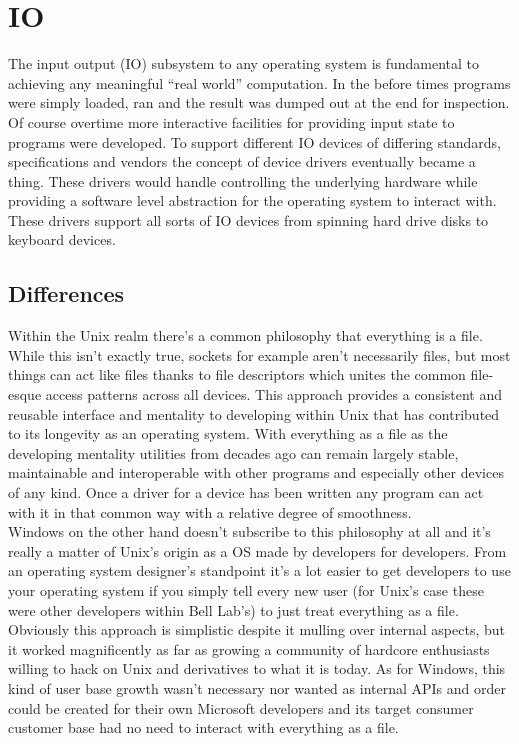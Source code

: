 \documentclass[letterpaper,10pt,draftclsnofoot,onecolumn]{IEEEtran}
\begin{document}
\section{IO}
The input output (IO) subsystem to any operating system is fundamental to achieving any meaningful “real world” computation. In the before times programs were simply loaded, ran and the result was dumped out at the end for inspection. Of course overtime more interactive facilities for providing input state to programs were developed. To support different IO devices of differing standards, specifications and vendors the concept of device drivers eventually became a thing. These drivers would handle controlling the underlying hardware while providing a software level abstraction for the operating system to interact with. These drivers support all sorts of IO devices from spinning hard drive disks to keyboard devices.\\

\subsection{Differences}
Within the Unix realm there’s a common philosophy \cite{love} that everything is a file. While this isn’t exactly true, sockets for example aren’t necessarily files, but most things can act like files thanks to file descriptors which unites the common file-esque access patterns across all devices. This approach provides a consistent and reusable interface and mentality to developing within Unix that has contributed to its longevity as an operating system. With everything as a file as the developing mentality utilities from decades ago can remain largely stable, maintainable and interoperable with other programs and especially other devices of any kind. Once a driver for a device has been written any program can act with it in that common way with a relative degree of smoothness.\\

Windows on the other hand doesn’t subscribe to this philosophy at all and it’s really a matter of Unix’s origin as a OS made by developers for developers. From an operating system designer’s standpoint it’s a lot easier to get developers to use your operating system if you simply tell every new user (for Unix’s case these were other developers within Bell Lab’s) to just treat everything as a file. Obviously this approach is simplistic despite it mulling over internal aspects, but it worked magnificently as far as growing a community of hardcore enthusiasts willing to hack on Unix and derivatives to what it is today. As for Windows, this kind of user base growth wasn’t necessary nor wanted as internal APIs and order could be created for their own Microsoft developers and its target consumer customer base had no need to interact with everything as a file.\\
\end{document}
